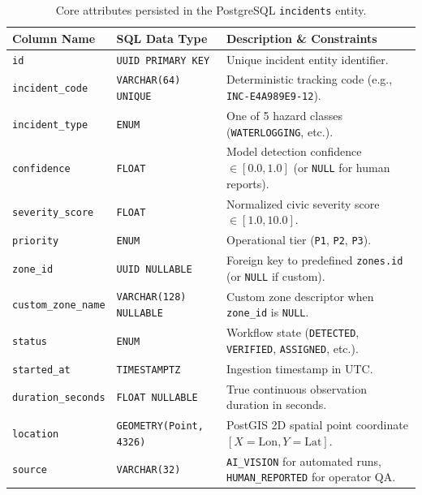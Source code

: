 \documentclass[11pt,a4paper]{article}
\begin{document}
\begin{table}[htbp]
\centering
\small
\caption{Core attributes persisted in the PostgreSQL \texttt{incidents} entity.}
\label{tab:incident_schema}
\begin{tabularx}{\textwidth}{l l X}
\toprule
\textbf{Column Name} & \textbf{SQL Data Type} & \textbf{Description \& Constraints} \\
\midrule
\texttt{id} & \texttt{UUID PRIMARY KEY} & Unique incident entity identifier. \\
\texttt{incident\_code} & \texttt{VARCHAR(64) UNIQUE} & Deterministic tracking code (e.g., \texttt{INC-E4A989E9-12}). \\
\texttt{incident\_type} & \texttt{ENUM} & One of 5 hazard classes (\texttt{WATERLOGGING}, etc.). \\
\texttt{confidence} & \texttt{FLOAT} & Model detection confidence $\in [0.0, 1.0]$ (or \texttt{NULL} for human reports). \\
\texttt{severity\_score} & \texttt{FLOAT} & Normalized civic severity score $\in [1.0, 10.0]$. \\
\texttt{priority} & \texttt{ENUM} & Operational tier (\texttt{P1}, \texttt{P2}, \texttt{P3}). \\
\texttt{zone\_id} & \texttt{UUID NULLABLE} & Foreign key to predefined \texttt{zones.id} (or \texttt{NULL} if custom). \\
\texttt{custom\_zone\_name} & \texttt{VARCHAR(128) NULLABLE} & Custom zone descriptor when \texttt{zone\_id} is \texttt{NULL}. \\
\texttt{status} & \texttt{ENUM} & Workflow state (\texttt{DETECTED}, \texttt{VERIFIED}, \texttt{ASSIGNED}, etc.). \\
\texttt{started\_at} & \texttt{TIMESTAMPTZ} & Ingestion timestamp in UTC. \\
\texttt{duration\_seconds} & \texttt{FLOAT NULLABLE} & True continuous observation duration in seconds. \\
\texttt{location} & \texttt{GEOMETRY(Point, 4326)} & PostGIS 2D spatial point coordinate $[X=\text{Lon}, Y=\text{Lat}]$. \\
\texttt{source} & \texttt{VARCHAR(32)} & \texttt{AI\_VISION} for automated runs, \texttt{HUMAN\_REPORTED} for operator QA. \\
\bottomrule
\end{tabularx}
\end{table}

\end{document}
